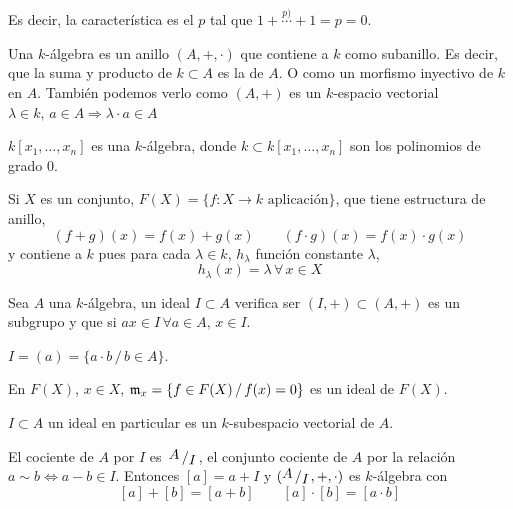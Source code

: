     Es decir, la caracter\'istica es el $p$ tal que $1+\overset{p)}{\cdots} + 1 = p =0$. 
\begin{defi}
    Una $k$-\'algebra es un anillo $(A,+,\cdot)$ que contiene a $k$ como subanillo. Es decir, que la suma y producto de $k\subset A$ es la de $A$. O como un morfismo inyectivo de $k$ en $A$. Tambi\'en podemos verlo como $(A,+)$ es un $k$-espacio vectorial $\lambda \in k, \, a\in  A \Rightarrow \lambda \cdot a \in A$
\end{defi}
\begin{ejem}
    $k[x_1,\ldots, x_n]$ es una $k$-\'algebra, donde $k \subset k[x_1,\ldots, x_n]$ son los polinomios de grado 0. 

    Si $X$ es un conjunto, $F(X) = \{f:X \longrightarrow k \text{ aplicaci\'on}\}$, que tiene estructura de anillo, 
    $$(f+g)(x) = f(x) + g(x) \qquad (f\cdot g)(x) = f(x) \cdot g(x)$$
    y contiene a $k$ pues para cada $\lambda \in k$, $h_{\lambda}$ funci\'on constante $\lambda$,
    $$h_{\lambda}(x) = \lambda \, \forall \, x\in X$$
\end{ejem}
\begin{defi}
    Sea $A$ una $k$-\'algebra, un ideal $I \subset A$ verifica ser $(I,+) \subset(A,+)$ es un subgrupo y que si $ax\in I \, \forall a\in A, \, x\in I$. 
\end{defi}\begin{ejem}
    $I = (a) = \{a\cdot b \, / \, b \in A\}$.
\end{ejem}
\begin{ejem}
    En $F(X)$, $x\in X$, $\mathfrak{m}_x = \{f \in F(X) \, / \, f(x)=0\}$ es un ideal de $F(X)$. 
\end{ejem}
\begin{obs}
    $I\subset A$ un ideal en particular es un $k$-subespacio vectorial de $A$. 
\end{obs}
\begin{defi}
    El cociente de $A$ por $I$ es $\, \modulo{A}{I}$, el conjunto cociente de $A$ por la relaci\'on $a\sim b \iff a-b \in I$. Entonces $[a]=a+I$ y $(\modulo{A}{I}, +, \cdot )$ es $k$-\'algebra con 
    $$[a]+[b] = [a+b]\qquad [a]\cdot [b] = [a\cdot b]$$
\end{defi}
